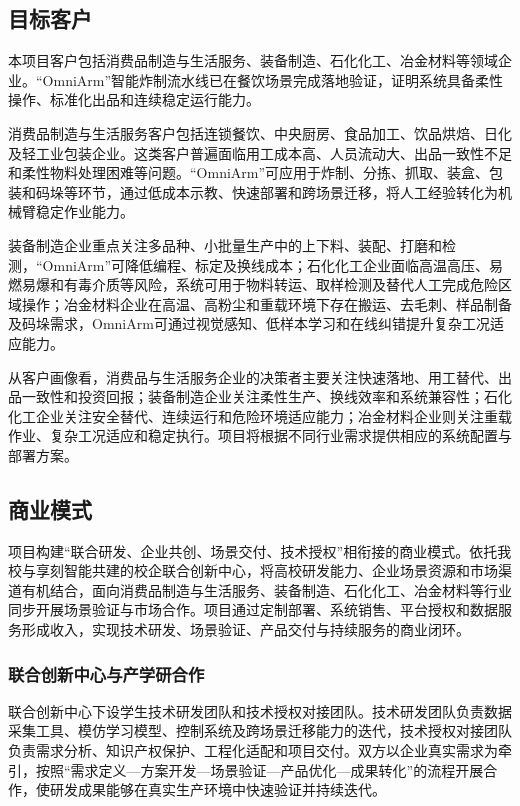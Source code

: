 \documentclass[zihao=-4]{ctexart}
\begin{document}
\subsection{目标客户}

本项目客户包括消费品制造与生活服务、装备制造、石化化工、冶金材料等领域企业。“OmniArm”智能炸制流水线已在餐饮场景完成落地验证，证明系统具备柔性操作、标准化出品和连续稳定运行能力。

消费品制造与生活服务客户包括连锁餐饮、中央厨房、食品加工、饮品烘焙、日化及轻工业包装企业。这类客户普遍面临用工成本高、人员流动大、出品一致性不足和柔性物料处理困难等问题。“OmniArm”可应用于炸制、分拣、抓取、装盒、包装和码垛等环节，通过低成本示教、快速部署和跨场景迁移，将人工经验转化为机械臂稳定作业能力。

装备制造企业重点关注多品种、小批量生产中的上下料、装配、打磨和检测，“OmniArm”可降低编程、标定及换线成本；石化化工企业面临高温高压、易燃易爆和有毒介质等风险，系统可用于物料转运、取样检测及替代人工完成危险区域操作；冶金材料企业在高温、高粉尘和重载环境下存在搬运、去毛刺、样品制备及码垛需求，OmniArm可通过视觉感知、低样本学习和在线纠错提升复杂工况适应能力。

从客户画像看，消费品与生活服务企业的决策者主要关注快速落地、用工替代、出品一致性和投资回报；装备制造企业关注柔性生产、换线效率和系统兼容性；石化化工企业关注安全替代、连续运行和危险环境适应能力；冶金材料企业则关注重载作业、复杂工况适应和稳定执行。项目将根据不同行业需求提供相应的系统配置与部署方案。

\subsection{商业模式}

项目构建“联合研发、企业共创、场景交付、技术授权”相衔接的商业模式。依托我校与享刻智能共建的校企联合创新中心，将高校研发能力、企业场景资源和市场渠道有机结合，面向消费品制造与生活服务、装备制造、石化化工、冶金材料等行业同步开展场景验证与市场合作。项目通过定制部署、系统销售、平台授权和数据服务形成收入，实现技术研发、场景验证、产品交付与持续服务的商业闭环。

\subsubsection{联合创新中心与产学研合作}

联合创新中心下设学生技术研发团队和技术授权对接团队。技术研发团队负责数据采集工具、模仿学习模型、控制系统及跨场景迁移能力的迭代，技术授权对接团队负责需求分析、知识产权保护、工程化适配和项目交付。双方以企业真实需求为牵引，按照“需求定义—方案开发—场景验证—产品优化—成果转化”的流程开展合作，使研发成果能够在真实生产环境中快速验证并持续迭代。
\end{document}
